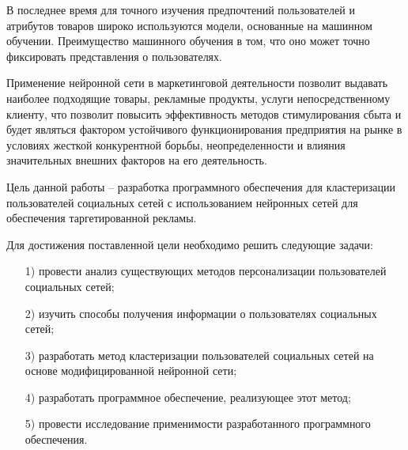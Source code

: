 В последнее время для точного изучения предпочтений пользователей и атрибутов товаров широко используются модели, основанные на машинном обучении. Преимущество машинного обучения в том, что оно может точно фиксировать представления о пользователях.

Применение нейронной сети в маркетинговой деятельности позволит выдавать наиболее подходящие товары, рекламные продукты, услуги непосредственному клиенту, что позволит повысить эффективность методов стимулирования сбыта и будет являться фактором устойчивого функционирования предприятия на рынке в условиях жесткой конкурентной борьбы, неопределенности и влияния значительных внешних факторов на его деятельность.

Цель данной работы -- разработка программного обеспечения для кластеризации пользователей социальных сетей с использованием нейронных сетей для обеспечения таргетированной рекламы.

Для достижения поставленной цели необходимо решить следующие задачи:
\begin{itemize}[leftmargin=1.6\parindent]
	\item[1)] провести анализ существующих методов персонализации пользователей социальных сетей;
	\item[2)] изучить способы получения информации о пользователях социальных сетей;
	\item[3)] разработать метод кластеризации пользователей социальных сетей  на основе модифицированной нейронной сети;
	\item[4)] разработать программное обеспечение, реализующее этот метод;
	\item[5)] провести исследование применимости разработанного программного обеспечения.
\end{itemize}

\pagebreak